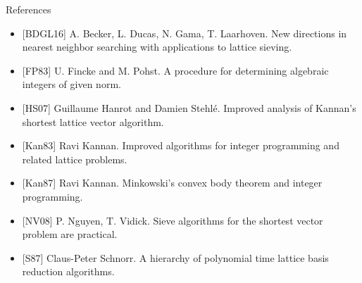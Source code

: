 \documentclass[usenames,dvipsnames, 9pt, aspectratio=169]{beamer}
\begin{document}
\begin{frame}{References}
	\begin{itemize}
		\setlength\itemsep{6pt}
		\item {\color{Orange} [BDGL16]}  A. Becker, L. Ducas, N. Gama, T. Laarhoven. New directions in nearest neighbor searching with applications to lattice sieving.
		\item {\color{Orange} [FP83]} U. Fincke and M. Pohst. A procedure for determining algebraic integers of given norm.
		\item {\color{Orange} [HS07]} Guillaume Hanrot and Damien Stehl{\'e}. Improved analysis of Kannan’s shortest lattice vector algorithm.
		\item {\color{Orange} [Kan83]} Ravi Kannan. Improved algorithms for integer programming and related lattice problems.
		\item {\color{Orange}[Kan87]} Ravi Kannan. Minkowski’s convex body theorem and integer programming. 
		\item {\color{Orange} [NV08]} P. Nguyen, T. Vidick. Sieve algorithms for the shortest vector problem are practical. 
		\item {\color{Orange}[S87]} Claus-Peter Schnorr. A hierarchy of polynomial time lattice basis reduction algorithms.

	\end{itemize}
	
\end{frame}
\end{document}
